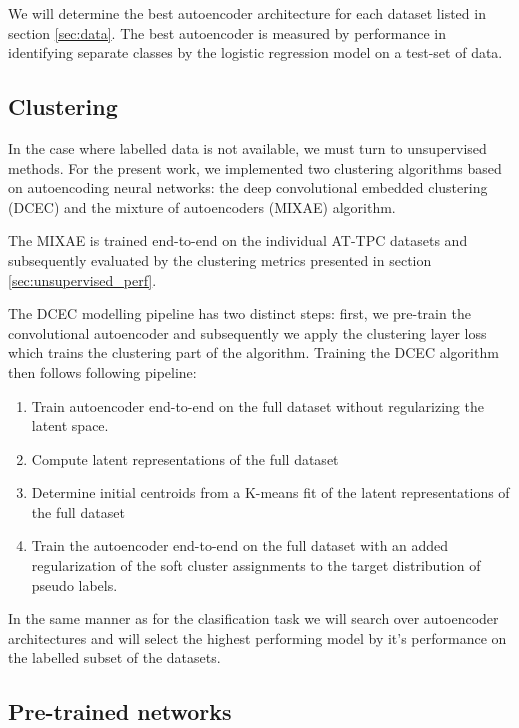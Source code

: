 We will determine the best autoencoder architecture for each dataset listed in section \ref{sec:data}. The best autoencoder is measured by performance in identifying separate classes by the logistic regression model on a test-set of data. 

\subsection{Clustering}

In the case where labelled data is not available, we must turn to unsupervised methods. For the present work, we implemented two clustering algorithms based on autoencoding neural networks: the deep convolutional embedded clustering (DCEC) and the mixture of autoencoders (MIXAE) algorithm. 

The MIXAE is trained end-to-end on the individual AT-TPC datasets and subsequently evaluated by the clustering metrics presented in section \ref{sec:unsupervised_perf}.

The DCEC modelling pipeline has two distinct steps: first, we pre-train the convolutional autoencoder and subsequently we apply the clustering layer loss which trains the clustering part of the algorithm. Training the DCEC algorithm then follows following pipeline: 

\begin{enumerate}
\item Train autoencoder end-to-end on the full dataset without regularizing the latent space. 
\item Compute latent representations of the full dataset
\item Determine initial centroids from a K-means fit of the latent representations of the full dataset
\item Train the autoencoder end-to-end on the full dataset with an added regularization of the soft cluster assignments to the target distribution of pseudo labels.
\end{enumerate}

In the same manner as for the clasification task we will search over autoencoder architectures and will select the highest performing model by it's performance on the labelled subset of the datasets.

\subsection{Pre-trained networks}

